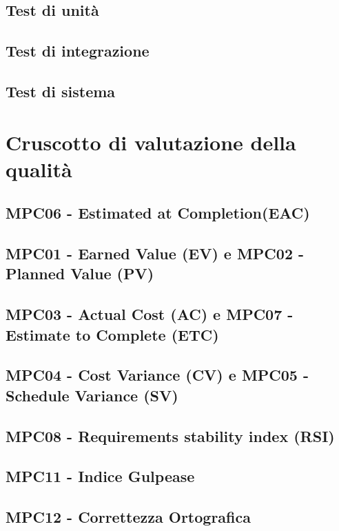 \documentclass[italian,12pt]{article} %
\begin{document}
\subsection{Test di unità}

\subsection{Test di integrazione}

\subsection{Test di sistema}

\newpage

\section{Cruscotto di valutazione della qualità}

\subsection{MPC06 - Estimated at Completion(EAC)}

\subsection{MPC01 - Earned Value (EV) e MPC02 - Planned Value (PV)}

\subsection{MPC03 - Actual Cost (AC) e MPC07 - Estimate to Complete (ETC)}

\subsection{MPC04 - Cost Variance (CV) e MPC05 - Schedule Variance (SV)}

\subsection{MPC08 - Requirements stability index (RSI)}

\subsection{MPC11 - Indice Gulpease}

\subsection{MPC12 - Correttezza Ortografica}
\end{document}

